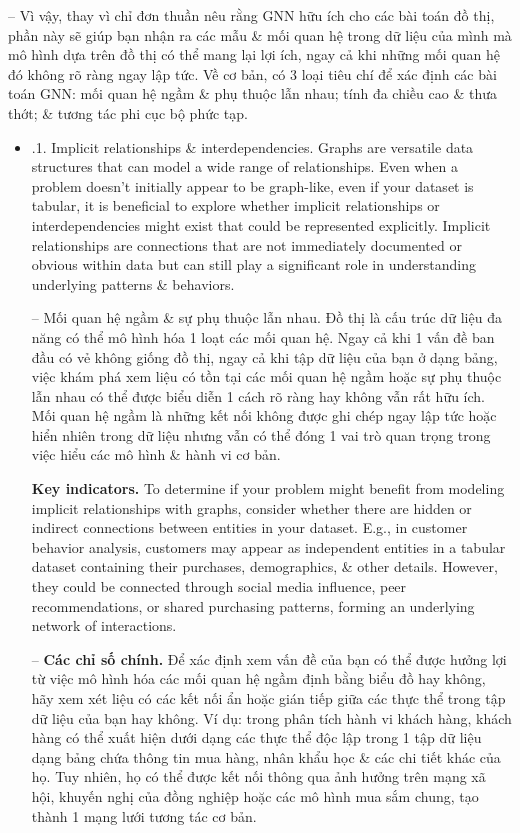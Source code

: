 \documentclass{article}
\begin{document}
\begin{itemize}
\begin{itemize}
        -- Vì vậy, thay vì chỉ đơn thuần nêu rằng GNN hữu ích cho các bài toán đồ thị, phần này sẽ giúp bạn nhận ra các mẫu \& mối quan hệ trong dữ liệu của mình mà mô hình dựa trên đồ thị có thể mang lại lợi ích, ngay cả khi những mối quan hệ đó không rõ ràng ngay lập tức. Về cơ bản, có 3 loại tiêu chí để xác định các bài toán GNN: mối quan hệ ngầm \& phụ thuộc lẫn nhau; tính đa chiều cao \& thưa thớt; \& tương tác phi cục bộ phức tạp.
        \begin{itemize}
            \item {.1. Implicit relationships \& interdependencies.} Graphs are versatile data structures that can model a wide range of relationships. Even when a problem doesn't initially appear to be graph-like, even if your dataset is tabular, it is beneficial to explore whether implicit relationships or interdependencies might exist that could be represented explicitly. Implicit relationships are connections that are not immediately documented or obvious within data but can still play a significant role in understanding underlying patterns \& behaviors.

            -- {\sf Mối quan hệ ngầm \& sự phụ thuộc lẫn nhau.} Đồ thị là cấu trúc dữ liệu đa năng có thể mô hình hóa 1 loạt các mối quan hệ. Ngay cả khi 1 vấn đề ban đầu có vẻ không giống đồ thị, ngay cả khi tập dữ liệu của bạn ở dạng bảng, việc khám phá xem liệu có tồn tại các mối quan hệ ngầm hoặc sự phụ thuộc lẫn nhau có thể được biểu diễn 1 cách rõ ràng hay không vẫn rất hữu ích. Mối quan hệ ngầm là những kết nối không được ghi chép ngay lập tức hoặc hiển nhiên trong dữ liệu nhưng vẫn có thể đóng 1 vai trò quan trọng trong việc hiểu các mô hình \& hành vi cơ bản.

            {\bf Key indicators.} To determine if your problem might benefit from modeling implicit relationships with graphs, consider whether there are hidden or indirect connections between entities in your dataset. E.g., in customer behavior analysis, customers may appear as independent entities in a tabular dataset containing their purchases, demographics, \& other details. However, they could be connected through social media influence, peer recommendations, or shared purchasing patterns, forming an underlying network of interactions.

            -- {\bf Các chỉ số chính.} Để xác định xem vấn đề của bạn có thể được hưởng lợi từ việc mô hình hóa các mối quan hệ ngầm định bằng biểu đồ hay không, hãy xem xét liệu có các kết nối ẩn hoặc gián tiếp giữa các thực thể trong tập dữ liệu của bạn hay không. Ví dụ: trong phân tích hành vi khách hàng, khách hàng có thể xuất hiện dưới dạng các thực thể độc lập trong 1 tập dữ liệu dạng bảng chứa thông tin mua hàng, nhân khẩu học \& các chi tiết khác của họ. Tuy nhiên, họ có thể được kết nối thông qua ảnh hưởng trên mạng xã hội, khuyến nghị của đồng nghiệp hoặc các mô hình mua sắm chung, tạo thành 1 mạng lưới tương tác cơ bản.


\end{itemize}
\end{itemize}
\end{itemize}
\end{document}

